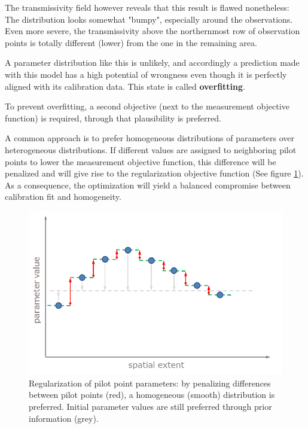 The transmissivity field however reveals that this result is flawed nonetheless: The distribution looks somewhat "bumpy", especially around the observations. Even more severe, the transmissivity above the northernmost row of observation points is totally different (lower) from the one in the remaining area.

A parameter distribution like this is unlikely, and accordingly a prediction made with this model has a high potential of wrongness even though it is perfectly aligned with its calibration data. This state is called \textbf{overfitting}.
\label{sec:fepest:Overfitting}

To prevent overfitting, a second objective (next to the measurement objective function) is required, through that plausibility is preferred.

A common approach is to prefer homogeneous distributions of parameters over heterogeneous distributions. If different values are assigned to neighboring pilot points to lower the measurement objective function, this difference will be penalized and will give rise to the regularization objective function (See figure \ref{fig:fepest:PrefferedValuesSmoothing}). As a consequence, the optimization will yield a balanced compromise between calibration fit and homogeneity.

\begin{figure}
	\center
	\includegraphics[width=\columnwidth]{figures/PrefferedValuesSmoothing.png}
\caption{Regularization of pilot point parameters: by penalizing differences between pilot points (red), a homogeneous (smooth) distribution is preferred. Initial parameter values are still preferred through prior information (grey).}
\label{fig:fepest:PrefferedValuesSmoothing}
\end{figure}

